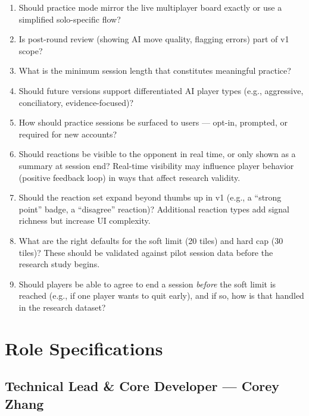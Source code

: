\documentclass[11pt]{article}
\begin{document}
\begin{enumerate}
  \item Should practice mode mirror the live multiplayer board exactly or use a simplified
        solo-specific flow?
  \item Is post-round review (showing AI move quality, flagging errors) part of v1 scope?
  \item What is the minimum session length that constitutes meaningful practice?
  \item Should future versions support differentiated AI player types (e.g., aggressive,
        conciliatory, evidence-focused)?
  \item How should practice sessions be surfaced to users --- opt-in, prompted, or required
        for new accounts?
  \item Should reactions be visible to the opponent in real time, or only shown as a
        summary at session end? Real-time visibility may influence player behavior (positive
        feedback loop) in ways that affect research validity.
  \item Should the reaction set expand beyond thumbs up in v1 (e.g., a ``strong point''
        badge, a ``disagree'' reaction)? Additional reaction types add signal richness but
        increase UI complexity.
  \item What are the right defaults for the soft limit (20 tiles) and hard cap (30 tiles)?
        These should be validated against pilot session data before the research study begins.
  \item Should players be able to agree to end a session \textit{before} the soft limit is
        reached (e.g., if one player wants to quit early), and if so, how is that handled
        in the research dataset?
\end{enumerate}

\section{Role Specifications}

\subsection{Technical Lead \& Core Developer --- Corey Zhang}
\end{document}
